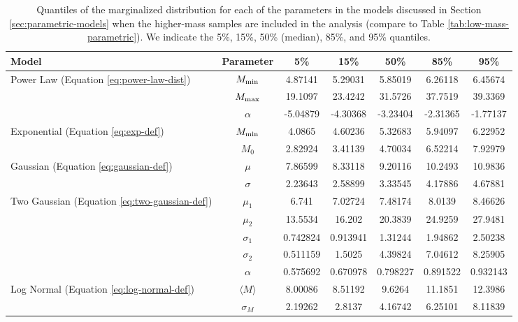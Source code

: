 \documentclass[preprint]{aastex}
\newcommand{\Mmin}{M_{\textnormal{min}}}
\newcommand{\Mmax}{M_{\textnormal{max}}}
\begin{document}
\begin{table}
  \begin{center}
    \begin{tabular}{|l|c|c|c|c|c|c|}
      \hline
      Model & Parameter & 5\% & 15\% & 50\% & 85\% & 95\% \\
      \hline \hline
      Power Law (Equation \eqref{eq:power-law-dist}) & $\Mmin$ & 
      4.87141 & 5.29031 & 5.85019 & 6.26118 & 6.45674 \\
      \hline
      & $\Mmax$ & 19.1097 & 23.4242 & 31.5726 & 37.7519 & 39.3369 \\
      \hline
      & $\alpha$ & -5.04879 & -4.30368 & -3.23404 & -2.31365 & -1.77137 \\
      \hline \hline
      Exponential (Equation \eqref{eq:exp-def})& $\Mmin$ & 
      4.0865 & 4.60236 & 5.32683 & 5.94097 & 6.22952 \\
      \hline
       & $M_0$ & 2.82924 & 3.41139 & 4.70034 & 6.52214 & 7.92979 \\
      \hline \hline
      Gaussian (Equation \eqref{eq:gaussian-def}) & $\mu$ & 
      7.86599 & 8.33118 & 9.20116 & 10.2493 & 10.9836 \\
      \hline
      & $\sigma$ & 2.23643 & 2.58899 & 3.33545 & 4.17886 & 4.67881 \\
      \hline \hline
      Two Gaussian (Equation \eqref{eq:two-gaussian-def}) & $\mu_1$ & 
      6.741 & 7.02724 & 7.48174 & 8.0139 & 8.46626 \\
      \hline
      & $\mu_2$ & 13.5534 & 16.202 & 20.3839 & 24.9259 & 27.9481 \\
      \hline
      & $\sigma_1$ & 0.742824 & 0.913941 & 1.31244 & 1.94862 & 2.50238 \\
      \hline
      & $\sigma_2$ & 0.511159 & 1.5025 & 4.39824 & 7.04612 & 8.25905 \\
      \hline
      & $\alpha$ & 0.575692 & 0.670978 & 0.798227 & 0.891522 & 0.932143 \\
      \hline \hline
      Log Normal (Equation \eqref{eq:log-normal-def}) & $\langle M \rangle$ & 
      8.00086 & 8.51192 & 9.6264 & 11.1851 & 12.3986 \\
      \hline
      & $\sigma_M$ & 2.19262 & 2.8137 & 4.16742 & 6.25101 & 8.11839 \\
      \hline
    \end{tabular}
  \end{center}
  \caption{\label{tab:high-mass-parametric} Quantiles of the
    marginalized distribution for each of the parameters in the models
    discussed in Section \ref{sec:parametric-models} when the
    higher-mass samples are included in the analysis (compare to Table
    \ref{tab:low-mass-parametric}).  We indicate the 5\%, 15\%, 50\% 
    (median), 85\%, and 95\% quantiles.}
\end{table}
\end{document}
